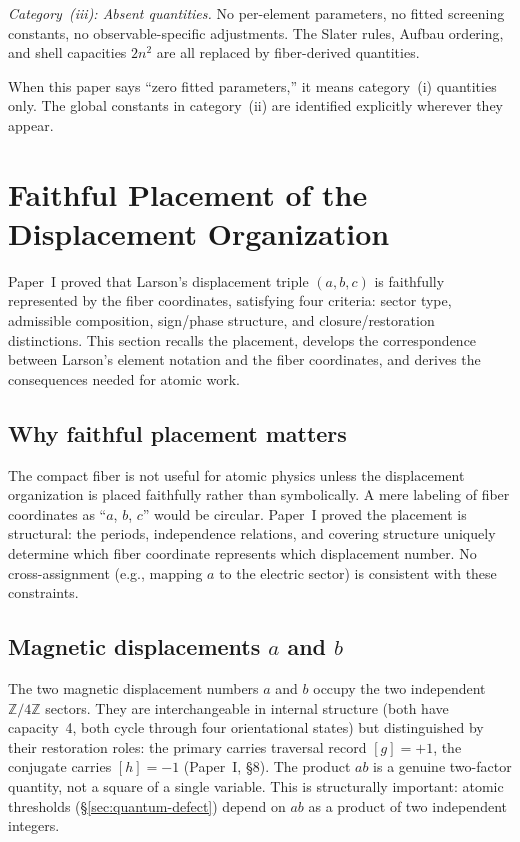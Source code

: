 \documentclass[11pt,a4paper]{article}
\begin{document}
\emph{Category~(iii): Absent quantities.} No per-element parameters, no fitted screening constants, no observable-specific adjustments. The Slater rules, Aufbau ordering, and shell capacities $2n^2$ are all replaced by fiber-derived quantities.

When this paper says ``zero fitted parameters,'' it means category~(i) quantities only. The global constants in category~(ii) are identified explicitly wherever they appear.

\section{Faithful Placement of the Displacement Organization}
\label{sec:placement}

Paper~I proved that Larson's displacement triple $(a, b, c)$ is faithfully represented by the fiber coordinates, satisfying four criteria: sector type, admissible composition, sign/phase structure, and closure/restoration distinctions. This section recalls the placement, develops the correspondence between Larson's element notation and the fiber coordinates, and derives the consequences needed for atomic work.

\subsection{Why faithful placement matters}

The compact fiber is not useful for atomic physics unless the displacement organization is placed faithfully rather than symbolically. A mere labeling of fiber coordinates as ``$a$, $b$, $c$'' would be circular. Paper~I proved the placement is structural: the periods, independence relations, and covering structure uniquely determine which fiber coordinate represents which displacement number. No cross-assignment (e.g., mapping $a$ to the electric sector) is consistent with these constraints.

\subsection{Magnetic displacements $a$ and $b$}

The two magnetic displacement numbers $a$ and $b$ occupy the two independent $\mathbb{Z}/4\mathbb{Z}$ sectors. They are interchangeable in internal structure (both have capacity~4, both cycle through four orientational states) but distinguished by their restoration roles: the primary carries traversal record $[g] = +1$, the conjugate carries $[h] = -1$ (Paper~I, \S8). The product $ab$ is a genuine two-factor quantity, not a square of a single variable. This is structurally important: atomic thresholds (\S\ref{sec:quantum-defect}) depend on $ab$ as a product of two independent integers.
\end{document}

